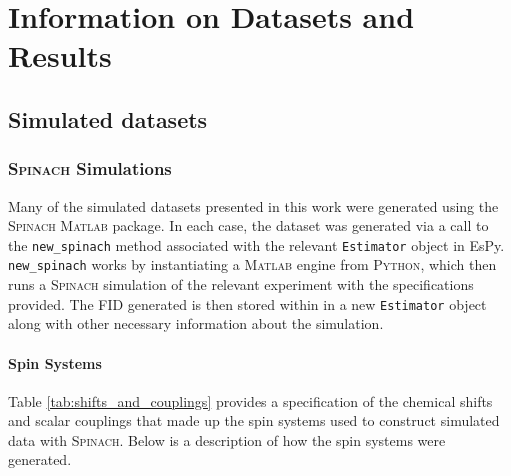 \chapter{Information on Datasets and Results}
\label{chap:datasets}

\section{Simulated datasets}
\label{sec:simulated-datasets}

\subsection{\textsc{\textsc{Spinach}} Simulations}
Many of the simulated datasets presented in this work were generated using the
\textsc{Spinach} \textsc{Matlab} package\cite{Hogben2011}.
In each case, the dataset was generated via a call to the \texttt{new\_spinach}
method associated with the relevant \texttt{Estimator} object in \ac{EsPy}.
\texttt{new\_spinach} works by instantiating a \textsc{Matlab} engine from
\textsc{Python}\cite{MatlabEngine}, which then runs a \textsc{\textsc{Spinach}}
simulation of the relevant experiment with the specifications provided. The
\ac{FID} generated is then stored within in a new \texttt{Estimator} object
along with other necessary information about the simulation.

\subsubsection{Spin Systems}
Table \ref{tab:shifts_and_couplings} provides a specification of the chemical
shifts and scalar couplings that made up the spin systems used to construct
simulated data with \textsc{Spinach}. Below is a description of how the spin
systems were generated.
